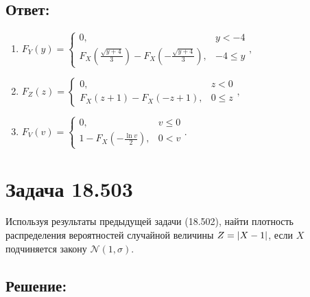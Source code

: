 \subsection*{Ответ:}
\begin{enumerate}
    \item $F_Y(y)
    = \left \{
    \begin{array}{ll}
        0,                                                                                           & y < -4    \\
        F_X \left ( \frac{\sqrt{y + 4}}{3} \right ) - F_X \left ( - \frac{\sqrt{y + 4}}{3} \right ), & -4 \leq y
    \end{array}
    \right .
    ,
    $
    \item $F_Z(z)
    = \left \{
    \begin{array}{ll}
        0,                        & z < 0    \\
        F_X(z + 1) - F_X(-z + 1), & 0 \leq z
    \end{array}
    \right .
    ,
    $
    \item $
    F_V(v)
    = \left \{
    \begin{array}{ll}
        0,                                         & v \leq 0 \\
        1 - F_X \left ( -\frac{\ln v}{2} \right ), & 0 < v
    \end{array}
    \right .
    .
    $
\end{enumerate}

\section*{Задача 18.503}

Используя результаты предыдущей задачи (18.502), найти плотность распределения вероятностей случайной величины $Z=\left | X-1 \right |$, если $X$ подчиняется закону
$\mathcal{N}(1,\sigma)$.

\subsection*{Решение:}

